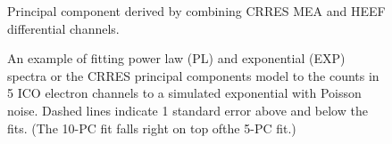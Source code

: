 \documentclass{article}    %
\begin{document}
\begin{figure}
\caption{Principal component derived by combining CRRES MEA and HEEF differential channels.}
\label{figPC_Model}
\end{figure}

\begin{figure}
\caption{An example of fitting power law (PL) and exponential (EXP) spectra
	or the CRRES principal components model to the counts in 5 ICO
	electron channels to a simulated exponential with Poisson
	noise. Dashed lines indicate 1 standard error above and below
	the fits. (The 10-PC fit falls right on top ofthe 5-PC fit.)}
\label{figSpec_Inv_example}
\end{figure}
\end{document}
